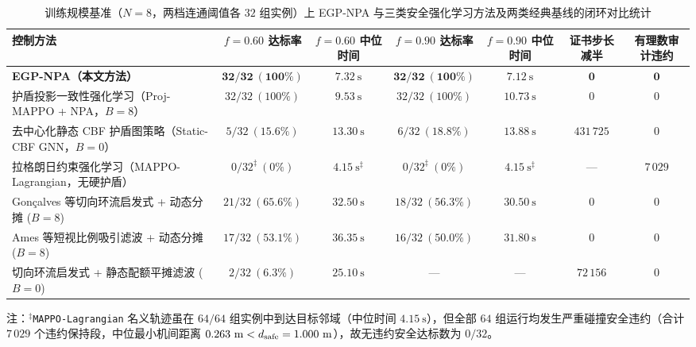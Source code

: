 \begin{table}[t]
 \centering\footnotesize
 \caption{训练规模基准（$N=8$，两档连通阈值各 $32$ 组实例）上 EGP-NPA 与三类安全强化学习方法及两类经典基线的闭环对比统计}\label{tab:e1}
 \begin{tabularx}{\textwidth}{@{}Xcccccc@{}}
 \toprule
 控制方法 & $f=0.60$ 达标率 & $f=0.60$ 中位时间 & $f=0.90$ 达标率 & $f=0.90$ 中位时间 & 证书步长减半 & 有理数审计违约\\
 \midrule
 \textbf{EGP-NPA（本文方法）} & $\mathbf{32/32\ (100\%)}$ & $\mathbf{7.32\ \mathrm s}$ & $\mathbf{32/32\ (100\%)}$ & $\mathbf{7.12\ \mathrm s}$ & $\mathbf{0}$ & $\mathbf{0}$\\
 护盾投影一致性强化学习\cite{wabersich2021,liu2026saferl}（Proj-MAPPO + NPA，$B=8$） & $32/32\ (100\%)$ & $9.53\ \mathrm s$ & $32/32\ (100\%)$ & $10.73\ \mathrm s$ & $0$ & $0$\\
 去中心化静态 CBF 护盾图策略\cite{zhang2025gcbf,zhang2025dgppo}（Static-CBF GNN，$B=0$） & $5/32\ (15.6\%)$ & $13.30\ \mathrm s$ & $6/32\ (18.8\%)$ & $13.88\ \mathrm s$ & $431\,725$ & $0$\\
 拉格朗日约束强化学习\cite{gu2023safe}（MAPPO-Lagrangian，无硬护盾） & $0/32^\ddagger\ (0\%)$ & $4.15\ \mathrm s^\ddagger$ & $0/32^\ddagger\ (0\%)$ & $4.15\ \mathrm s^\ddagger$ & --- & $7\,029$\\
 Gon\c{c}alves 等\cite{goncalves2023circulation}切向环流启发式 + 动态分摊 ($B=8$) & $21/32\ (65.6\%)$ & $32.50\ \mathrm s$ & $18/32\ (56.3\%)$ & $30.50\ \mathrm s$ & $0$ & $0$\\
 Ames 等\cite{ames2017cbf,reis2021}短视比例吸引滤波 + 动态分摊 ($B=8$) & $17/32\ (53.1\%)$ & $36.35\ \mathrm s$ & $16/32\ (50.0\%)$ & $31.80\ \mathrm s$ & $0$ & $0$\\
 切向环流启发式 + 静态配额平摊滤波\cite{ames2017cbf,zhang2025gcbf} ($B=0$) & $2/32\ (6.3\%)$ & $25.10\ \mathrm s$ & --- & --- & $72\,156$ & $0$\\
 \bottomrule
 \end{tabularx}
 \vspace{1.5pt}
 \par\raggedright\scriptsize 注：$^\ddagger$\texttt{MAPPO-Lagrangian} 名义轨迹虽在 $64/64$ 组实例中到达目标邻域（中位时间 $4.15\ \mathrm s$），但全部 $64$ 组运行均发生严重碰撞安全违约（合计 $7\,029$ 个违约保持段，中位最小机间距离 $0.263\ \mathrm m < d_{\mathrm{safe}}=1.000\ \mathrm m$），故无违约安全达标数为 $0/32$。
\end{table}

